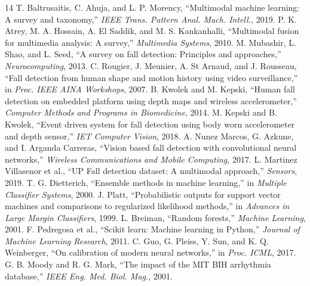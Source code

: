 \documentclass[conference]{IEEEtran}
\begin{document}
\begin{thebibliography}{14}
 T. Baltrusaitis, C. Ahuja, and L. P. Morency,
``Multimodal machine learning: A survey and taxonomy,'' \emph{IEEE Trans.
Pattern Anal. Mach. Intell.}, 2019.
 P. K. Atrey, M. A. Hossain, A. El Saddik, and M. S.
Kankanhalli, ``Multimodal fusion for multimedia analysis: A survey,''
\emph{Multimedia Systems}, 2010.
 M. Mubashir, L. Shao, and L. Seed, ``A survey on fall
detection: Principles and approaches,'' \emph{Neurocomputing}, 2013.
 C. Rougier, J. Meunier, A. St Arnaud, and J. Rousseau,
``Fall detection from human shape and motion history using video
surveillance,'' in \emph{Proc. IEEE AINA Workshops}, 2007.
 B. Kwolek and M. Kepski, ``Human fall detection on embedded
platform using depth maps and wireless accelerometer,'' \emph{Computer Methods
and Programs in Biomedicine}, 2014.
 M. Kepski and B. Kwolek, ``Event driven system for fall
detection using body worn accelerometer and depth sensor,'' \emph{IET Computer
Vision}, 2018.
 A. Nunez Marcos, G. Azkune, and I. Arganda Carreras,
``Vision based fall detection with convolutional neural networks,'' \emph{Wireless
Communications and Mobile Computing}, 2017.
 L. Martinez Villasenor et al., ``UP Fall detection
dataset: A multimodal approach,'' \emph{Sensors}, 2019.
 T. G. Dietterich, ``Ensemble methods in machine
learning,'' in \emph{Multiple Classifier Systems}, 2000.
 J. Platt, ``Probabilistic outputs for support vector
machines and comparisons to regularized likelihood methods,'' in \emph{Advances
in Large Margin Classifiers}, 1999.
 L. Breiman, ``Random forests,'' \emph{Machine Learning},
2001.
 F. Pedregosa et al., ``Scikit learn: Machine learning in
Python,'' \emph{Journal of Machine Learning Research}, 2011.
 C. Guo, G. Pleiss, Y. Sun, and K. Q. Weinberger, ``On
calibration of modern neural networks,'' in \emph{Proc. ICML}, 2017.
 G. B. Moody and R. G. Mark, ``The impact of the MIT BIH
arrhythmia database,'' \emph{IEEE Eng. Med. Biol. Mag.}, 2001.
\end{thebibliography}
\end{document}
